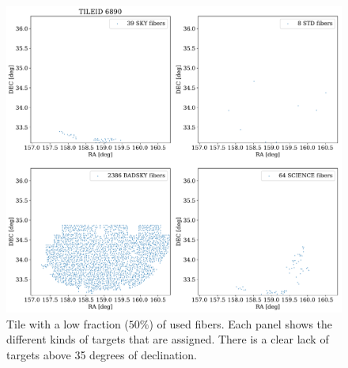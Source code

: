 \documentclass{article}
\begin{document}
\begin{figure}[!h]
\begin{center}
\begin{center}
\includegraphics[scale=0.40]{single_tile_6890.pdf}
\end{center}
\caption{Tile with a low fraction ($50\%$) of used fibers.
Each panel shows the different kinds of targets that are
assigned. There is a clear lack of targets above 35 degrees of
declination. 
\label{fig:tile_low_fraction}}
\end{center}
\end{figure}
\end{document}
